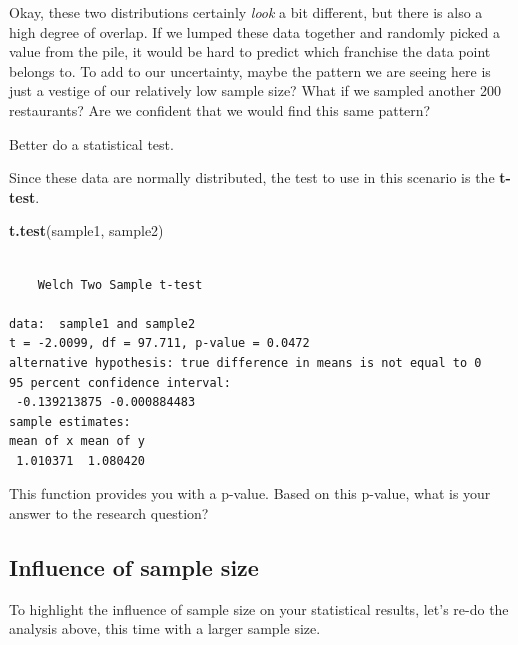 \documentclass[
]{book}
\newenvironment{Shaded}{\begin{snugshade}}{\end{snugshade}}
\newcommand{\KeywordTok}[1]{\textcolor[rgb]{0.13,0.29,0.53}{\textbf{#1}}}
\newcommand{\NormalTok}[1]{#1}
\begin{document}
Okay, these two distributions certainly \emph{look} a bit different, but there is also a high degree of overlap. If we lumped these data together and randomly picked a value from the pile, it would be hard to predict which franchise the data point belongs to.
To add to our uncertainty, maybe the pattern we are seeing here is just a vestige of our relatively low sample size? What if we sampled another 200 restaurants? Are we confident that we would find this same pattern?

Better do a statistical test.

Since these data are normally distributed, the test to use in this scenario is the \textbf{t-test}.

\begin{Shaded}
\begin{Highlighting}[]
\KeywordTok{t.test}\NormalTok{(sample1, }
\NormalTok{       sample2)}
\end{Highlighting}
\end{Shaded}

\begin{verbatim}

    Welch Two Sample t-test

data:  sample1 and sample2
t = -2.0099, df = 97.711, p-value = 0.0472
alternative hypothesis: true difference in means is not equal to 0
95 percent confidence interval:
 -0.139213875 -0.000884483
sample estimates:
mean of x mean of y 
 1.010371  1.080420 
\end{verbatim}

This function provides you with a p-value. Based on this p-value, what is your answer to the research question?

\hypertarget{influence-of-sample-size}{%
\subsection*{Influence of sample size}\label{influence-of-sample-size}}

To highlight the influence of sample size on your statistical results, let's re-do the analysis above, this time with a larger sample size.
\end{document}
